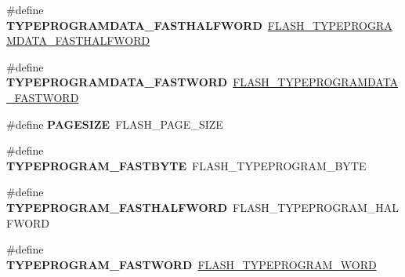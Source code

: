 \begin{DoxyCompactItemize}
\item 
\hypertarget{group___h_a_l___f_l_a_s_h___aliased___defines_gaa7602be5fde7d3dfbc33cd647ade049f}{\#define {\bfseries T\-Y\-P\-E\-P\-R\-O\-G\-R\-A\-M\-D\-A\-T\-A\-\_\-\-F\-A\-S\-T\-H\-A\-L\-F\-W\-O\-R\-D}~\hyperlink{group___f_l_a_s_h_ex___type___program___data_ga06b94dbaa93b2bdd94a4e8b48cbf5770}{F\-L\-A\-S\-H\-\_\-\-T\-Y\-P\-E\-P\-R\-O\-G\-R\-A\-M\-D\-A\-T\-A\-\_\-\-F\-A\-S\-T\-H\-A\-L\-F\-W\-O\-R\-D}}\label{group___h_a_l___f_l_a_s_h___aliased___defines_gaa7602be5fde7d3dfbc33cd647ade049f}

\item 
\hypertarget{group___h_a_l___f_l_a_s_h___aliased___defines_ga871de63c00336d70644a300bc2a67f01}{\#define {\bfseries T\-Y\-P\-E\-P\-R\-O\-G\-R\-A\-M\-D\-A\-T\-A\-\_\-\-F\-A\-S\-T\-W\-O\-R\-D}~\hyperlink{group___f_l_a_s_h_ex___type___program___data_ga7223e44f993459e906d19748753e7780}{F\-L\-A\-S\-H\-\_\-\-T\-Y\-P\-E\-P\-R\-O\-G\-R\-A\-M\-D\-A\-T\-A\-\_\-\-F\-A\-S\-T\-W\-O\-R\-D}}\label{group___h_a_l___f_l_a_s_h___aliased___defines_ga871de63c00336d70644a300bc2a67f01}

\item 
\hypertarget{group___h_a_l___f_l_a_s_h___aliased___defines_ga519adc2af3ba06a8f0548b6690050a89}{\#define {\bfseries P\-A\-G\-E\-S\-I\-Z\-E}~F\-L\-A\-S\-H\-\_\-\-P\-A\-G\-E\-\_\-\-S\-I\-Z\-E}\label{group___h_a_l___f_l_a_s_h___aliased___defines_ga519adc2af3ba06a8f0548b6690050a89}

\item 
\hypertarget{group___h_a_l___f_l_a_s_h___aliased___defines_ga07e4cba7de4bf96cfafa957245f9d06d}{\#define {\bfseries T\-Y\-P\-E\-P\-R\-O\-G\-R\-A\-M\-\_\-\-F\-A\-S\-T\-B\-Y\-T\-E}~F\-L\-A\-S\-H\-\_\-\-T\-Y\-P\-E\-P\-R\-O\-G\-R\-A\-M\-\_\-\-B\-Y\-T\-E}\label{group___h_a_l___f_l_a_s_h___aliased___defines_ga07e4cba7de4bf96cfafa957245f9d06d}

\item 
\hypertarget{group___h_a_l___f_l_a_s_h___aliased___defines_gad562e3d208ce464a19d5ec356e7f21ff}{\#define {\bfseries T\-Y\-P\-E\-P\-R\-O\-G\-R\-A\-M\-\_\-\-F\-A\-S\-T\-H\-A\-L\-F\-W\-O\-R\-D}~F\-L\-A\-S\-H\-\_\-\-T\-Y\-P\-E\-P\-R\-O\-G\-R\-A\-M\-\_\-\-H\-A\-L\-F\-W\-O\-R\-D}\label{group___h_a_l___f_l_a_s_h___aliased___defines_gad562e3d208ce464a19d5ec356e7f21ff}

\item 
\hypertarget{group___h_a_l___f_l_a_s_h___aliased___defines_ga1c170a7eba13377a1922bf6750b1f0ce}{\#define {\bfseries T\-Y\-P\-E\-P\-R\-O\-G\-R\-A\-M\-\_\-\-F\-A\-S\-T\-W\-O\-R\-D}~\hyperlink{group___f_l_a_s_h___type___program_gadd25c6821539030ba6711e7c0d586c3e}{F\-L\-A\-S\-H\-\_\-\-T\-Y\-P\-E\-P\-R\-O\-G\-R\-A\-M\-\_\-\-W\-O\-R\-D}}\label{group___h_a_l___f_l_a_s_h___aliased___defines_ga1c170a7eba13377a1922bf6750b1f0ce}


\end{DoxyCompactItemize}
